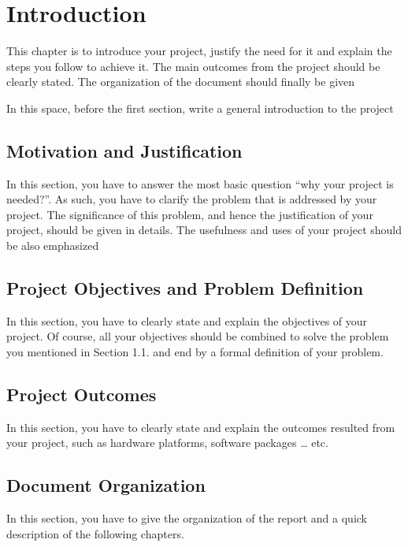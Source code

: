 \section{Introduction}
This chapter is to introduce your project, justify the need for it and explain the steps you follow to achieve it. The main outcomes from the project should be clearly stated. The organization of the document should finally be given

In this space, before the first section, write a general introduction to the project

\subsection{Motivation and Justification}
In this section, you have to answer the most basic question “why your project is needed?”. As such, you have to clarify the problem that is addressed by your project. The significance of this problem, and hence the justification of your project, should be given in details. The usefulness and uses of your project should be also emphasized

\subsection{Project Objectives and Problem Definition}
In this section, you have to clearly state and explain the objectives of your project. Of course, all your objectives should be combined to solve the problem you mentioned in Section 1.1. and end by a formal definition of your problem.

\subsection{Project Outcomes}
In this section, you have to clearly state and explain the outcomes resulted from your project, such as hardware platforms, software packages … etc.

\subsection{Document Organization}
In this section, you have to give the organization of the report and a quick description of the following chapters.

